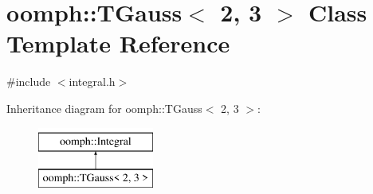 \hypertarget{classoomph_1_1TGauss_3_012_00_013_01_4}{}\section{oomph\+:\+:T\+Gauss$<$ 2, 3 $>$ Class Template Reference}
\label{classoomph_1_1TGauss_3_012_00_013_01_4}


{\ttfamily \#include $<$integral.\+h$>$}

Inheritance diagram for oomph\+:\+:T\+Gauss$<$ 2, 3 $>$\+:\begin{figure}[H]
\begin{center}
\leavevmode
\includegraphics[height=2.000000cm]{classoomph_1_1TGauss_3_012_00_013_01_4}
\end{center}
\end{figure}
